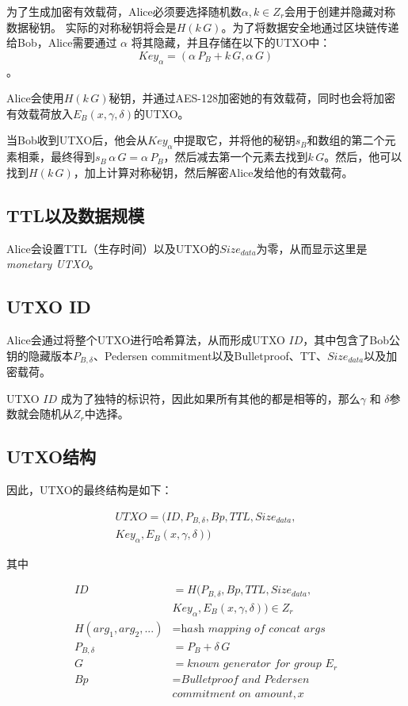 \documentclass[8pt,fleqn,openany]{book}
\begin{document}
\begin{CJK*}{UTF8}{gbsn}
{为了生成加密有效载荷，Alice必须要选择随机数$\alpha, k \in Z_r$会用于创建并隐藏对称数据秘钥。
实际的对称秘钥将会是$H(k \, G)$。为了将数据安全地通过区块链传递给Bob，Alice需要通过 $\alpha$ 将其隐藏，并且存储在以下的UTXO中：$$\mathit{Key}_{\alpha} = (\alpha \, P_{B} + k \, G, \alpha \, G )$$。

Alice会使用$H(k \, G)$秘钥，并通过AES-128加密她的有效载荷，同时也会将加密有效载荷放入$E_B(x, \gamma, \delta)$的UTXO。

当Bob收到UTXO后，他会从$\mathit{Key}_{\alpha}$中提取它，并将他的秘钥$s_B$和数组的第二个元素相乘，最终得到$s_B \, \alpha \, G = \alpha \, P_B$，然后减去第一个元素去找到$k \, G$。然后，他可以找到$H(k \, G)$，加上计算对称秘钥，然后解密Alice发给他的有效载荷。

\subsection{TTL以及数据规模} Alice会设置TTL（生存时间）以及UTXO的$Size_{data}$为零，从而显示这里是\textit{monetary UTXO}。

\subsection{UTXO ID} Alice会通过将整个UTXO进行哈希算法，从而形成UTXO $\mathit{ID}$，其中包含了Bob公钥的隐藏版本$P_{B, \delta}$、Pedersen commitment以及Bulletproof、TT、$Size_{data}$以及加密载荷。

UTXO $\mathit{ID}$ 成为了独特的标识符，因此如果所有其他的都是相等的，那么$\gamma$ 和 $\delta$参数就会随机从$Z_r$中选择。

\subsection{UTXO结构}
因此，UTXO的最终结构是如下：

\begin{multline*}
UTXO = (ID, P_{B, \delta}, Bp, TTL, Size_{data},\\
Key_{\alpha}, E_B(x, \gamma, \delta))
\end{multline*}

其中

\begin{align*}
ID &= H(P_{B, \delta}, Bp, TTL, Size_{data}, \\ 
& Key_{\alpha}, E_B(x, \gamma, \delta)) \in Z_r \\
H(arg_1, arg_2, ...) &= \textit{hash mapping of concat args} \\
P_{B, \delta} &= P_B + \delta \, G \\
G &= \textit{known generator for group } E_r \\
Bp &= \textit{Bulletproof and Pedersen} \\
& \textit{commitment on amount}, x 
\end{align*}

}
\end{CJK*}
\end{document}
